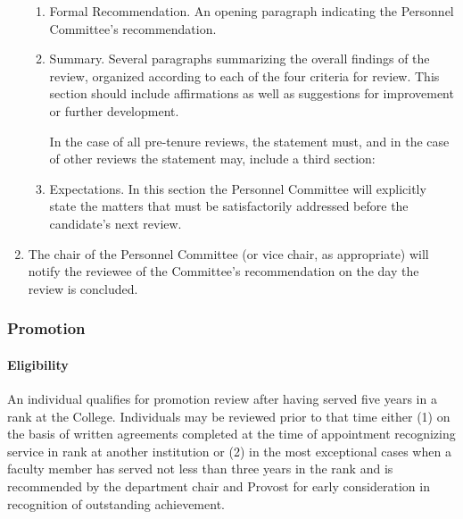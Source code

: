 \begin{enumerate}[label=\alph*)]
{						\begin{enumerate}[label=\arabic*)]
							\item{Formal Recommendation.  An opening paragraph indicating the Personnel Committee's recommendation.}
							\item{Summary.  Several paragraphs summarizing the overall findings of the review, organized according to each of the four criteria for review.  This section should include affirmations as well as suggestions for improvement or further development.}

							In the case of all pre-tenure reviews,
							the statement must, and in the case of other reviews the statement may, include a third section:

							\item{Expectations.  In this section the Personnel Committee will explicitly state the matters that must be satisfactorily addressed before the candidate's
								next
								review.}
						\end{enumerate}
					}
					\item{  The chair of the Personnel Committee (or vice chair, as appropriate) will notify the reviewee of the Committee's recommendation on the day the review is concluded.}
				\end{enumerate}
		\subsubsection{Promotion}
			\paragraph{Eligibility}
				An individual qualifies for promotion review after having served five years in a rank at the College.  Individuals may be reviewed prior to that time either (1) on the basis of written agreements completed at the time of appointment recognizing service in rank at another institution or (2) in the most exceptional cases when a faculty member has served not less than three years in the rank and is recommended by the department chair and Provost for early consideration in recognition of outstanding achievement.
